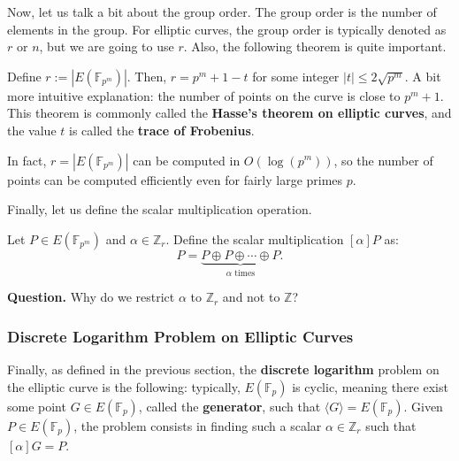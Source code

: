 \documentclass[../lecture-notes.tex]{subfiles}
\begin{document}
Now, let us talk a bit about the group order. The group order is the number of elements in the group. For elliptic curves, the group order is typically denoted as $r$ or $n$, but we are going to use $r$. Also, the following theorem is quite important.

\begin{theorem}
    Define $r := |E(\mathbb{F}_{p^m})|$. Then, $r = p^m + 1 - t$ for some integer $|t| \leq 2\sqrt{p^m}$. A bit more intuitive explanation: the number of points on the curve is close to $p^m+1$. This theorem is commonly called the \textbf{Hasse's theorem on elliptic curves}, and the value $t$ is called the \textbf{trace of Frobenius}.
\end{theorem}

\begin{remark}
    In fact, $r=|E(\mathbb{F}_{p^m})|$ can be computed in $O(\log(p^m))$, so the number of points can be computed efficiently even for fairly large primes $p$.
\end{remark}

Finally, let us define the scalar multiplication operation. 

\begin{definition}
    Let $P \in E(\mathbb{F}_{p^m})$ and $\alpha \in \mathbb{Z}_r$. Define the scalar multiplication $[\alpha]P$ as:
    \begin{equation}
        [\alpha]P = \underbrace{P \oplus P \oplus \cdots \oplus P}_{\alpha \text{ times}}.
    \end{equation}
\end{definition}

\textbf{Question.} Why do we restrict $\alpha$ to $\mathbb{Z}_r$ and not to $\mathbb{Z}$?

\subsubsection{Discrete Logarithm Problem on Elliptic Curves}
Finally, as defined in the previous section, the \textbf{discrete logarithm} problem on the elliptic curve is the following: typically, $E(\mathbb{F}_p)$ is cyclic, meaning there exist some point $G \in E(\mathbb{F}_p)$, called the \textbf{generator}, such that $\langle G \rangle = E(\mathbb{F}_p)$. Given $P \in E(\mathbb{F}_p)$, the problem consists in finding such a scalar $\alpha \in \mathbb{Z}_r$ such that $[\alpha]G = P$. 
\end{document}
